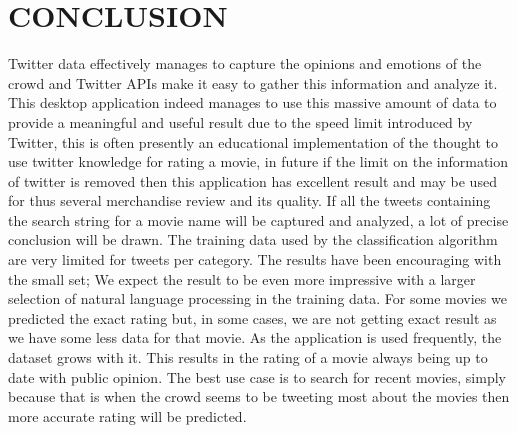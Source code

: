 \documentclass[a4paper]{article}
\begin{document}
\section{CONCLUSION}
Twitter data effectively manages to capture the opinions and emotions of the crowd and Twitter APIs make it easy to gather this information and analyze it. This desktop application indeed manages to use this massive amount of data to provide a meaningful and useful result due to the speed limit introduced by Twitter, this is often presently an educational implementation of the thought to use twitter knowledge for rating a movie, in future if the limit on the information of twitter is removed then this application has excellent result and may be used for thus several merchandise review and its quality. If all the tweets containing the search string for a movie name will be captured and analyzed, a lot of precise conclusion will be drawn. The training data used by the classification algorithm are very limited for tweets per category. The results have been encouraging with the small set; We expect the result to be even more impressive with a larger selection of natural language processing in the training data. For some movies we predicted the exact rating but, in some cases, we are not getting exact result as we have some less data for that movie. As the application is used frequently, the dataset grows with it. This results in the rating of a movie always being up to date with public opinion. The best use case is to search for recent movies, simply because that is when the crowd seems to be tweeting most about the movies then more accurate rating will be predicted.
\end{document}
